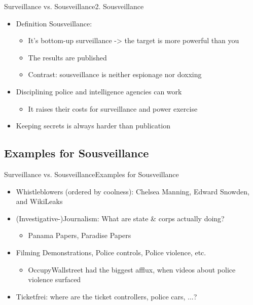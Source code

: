 \documentclass[10pt]{beamer}
\begin{document}
{\begin{frame}{Surveillance vs. Sousveillance}{2. Sousveillance}
\begin{itemize}
  \item<1-> Definition Sousveillance:
  \begin{itemize}
    \item It's bottom-up surveillance -> the target is more powerful than you
    \item The results are published
    \item Contrast: sousveillance is neither espionage nor doxxing
  \end{itemize}
  \item<2-> Disciplining police and intelligence agencies can work
  \begin{itemize}
    \item<2-> It raises their costs for surveillance and power exercise
  \end{itemize}
  \item<2-> Keeping secrets is always harder than publication
\end{itemize}

\end{frame}

\subsection{Examples for Sousveillance}
\begin{frame}{Surveillance vs. Sousveillance}{Examples for Sousveillance}

\begin{itemize}
  \item<1-> Whistleblowers (ordered by coolness): Chelsea Manning, Edward Snowden, and WikiLeaks
  \item<1-> (Investigative-)Journalism: What are state \& corps actually doing?
  \begin{itemize}
    \item<2-> Panama Papers, Paradise Papers
  \end{itemize}
  \item<2-> Filming Demonstrations, Police controls, Police violence, etc.
  \begin{itemize}
    \item<2-> OccupyWallstreet had the biggest afflux, when videos about police violence surfaced
  \end{itemize}
  \item<3-> Ticketfrei: where are the ticket controllers, police cars, ...?
\end{itemize}


\end{frame}}
\end{document}
